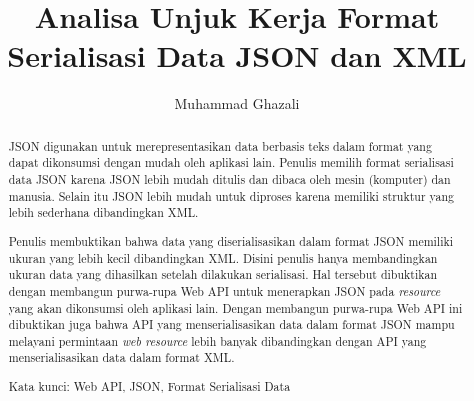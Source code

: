 \documentclass{llncs}
\begin{document}
\title{Analisa Unjuk Kerja Format Serialisasi Data JSON dan XML}




\author{Muhammad Ghazali}





\maketitle

\begin{abstract}

\onehalfspacing JSON digunakan untuk merepresentasikan data berbasis teks dalam format yang dapat dikonsumsi dengan mudah oleh aplikasi lain. Penulis memilih format serialisasi data JSON karena JSON lebih mudah ditulis dan dibaca oleh mesin (komputer) dan manusia. Selain itu JSON lebih mudah untuk diproses karena memiliki struktur yang lebih sederhana dibandingkan XML\cite{json-fat-free}\cite{json-vs-xml-debate}\cite{introducing-json}.

\onehalfspacing Penulis membuktikan bahwa data yang diserialisasikan dalam format JSON memiliki ukuran yang lebih kecil dibandingkan XML. Disini penulis hanya membandingkan ukuran data yang dihasilkan setelah dilakukan serialisasi. Hal tersebut dibuktikan dengan membangun purwa-rupa Web API untuk menerapkan JSON pada \textit{resource} yang akan dikonsumsi oleh aplikasi lain. Dengan membangun purwa-rupa Web API ini dibuktikan juga bahwa API yang menserialisasikan data dalam format JSON mampu melayani permintaan \textit{web resource} lebih banyak dibandingkan dengan API yang menserialisasikan data dalam format XML.

Kata kunci: Web API, JSON, Format Serialisasi Data
\end{abstract}
\end{document}
